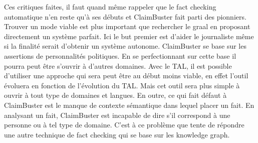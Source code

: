 Ces critiques faites, il faut quand même rappeler que le fact checking automatique n'en reste qu'à ses débuts et ClaimBuster fait parti des pionniers. Trouver un mode viable est plus important que rechercher le graal en proposant directement un système parfait. Ici le but premier est d'aider le journaliste même si la finalité serait d'obtenir un système autonome. ClaimBuster se base sur les assertions de personnalités politiques. En se perfectionnant sur cette base il pourra peut être s'ouvrir à d'autres domaines. Avec le TAL, il est possible d'utiliser une approche qui sera peut être au début moins viable, en effet l'outil évoluera en fonction de l'évolution du TAL. Mais cet outil sera plus simple à ouvrir à tout type de domaines et langues. En outre, ce qui fait défaut à ClaimBuster est le manque de contexte sémantique dans lequel placer un fait. En analysant un fait, ClaimBuster est incapable de dire s'il correspond à une personne ou à tel type de domaine. C'est à ce problème que tente de répondre une autre technique de fact checking qui se base sur les knowledge graph.



